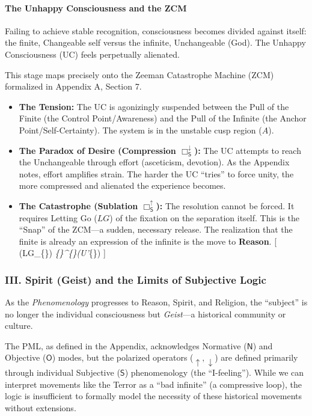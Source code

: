 \paragraph{The Unhappy Consciousness and the ZCM}\label{the-unhappy-consciousness-and-the-zcm}

Failing to achieve stable recognition, consciousness becomes divided against itself: the finite, Changeable self versus the infinite, Unchangeable (God). The Unhappy Consciousness (UC) feels perpetually alienated.

This stage maps precisely onto the Zeeman Catastrophe Machine (ZCM) formalized in Appendix A, Section 7.

\begin{itemize}
\tightlist
\item
  \textbf{The Tension:} The UC is agonizingly suspended between the Pull of the Finite (the Control Point/Awareness) and the Pull of the Infinite (the Anchor Point/Self-Certainty). The system is in the unstable cusp region (\(A\)).
\item
  \textbf{The Paradox of Desire (Compression \(\Box_{\mathsf{S}}^{\downarrow}\)):} The UC attempts to reach the Unchangeable through effort (asceticism, devotion). As the Appendix notes, effort amplifies strain. The harder the UC ``tries'' to force unity, the more compressed and alienated the experience becomes.
\item
  \textbf{The Catastrophe (Sublation \(\Box_{\mathsf{S}}^{\uparrow}\)):} The resolution cannot be forced. It requires Letting Go (\(LG\)) of the fixation on the separation itself. This is the ``Snap'' of the ZCM---a sudden, necessary release. The realization that the finite is already an expression of the infinite is the move to \textbf{Reason}. {[} (LG\_\{\}) \implies \Box\emph{\{\}\^{}\{\uparrow\}(U'}\{\}) {]}
\end{itemize}

\subsubsection{III. Spirit (Geist) and the Limits of Subjective Logic}\label{iii.-spirit-geist-and-the-limits-of-subjective-logic}

As the \emph{Phenomenology} progresses to Reason, Spirit, and Religion, the ``subject'' is no longer the individual consciousness but \emph{Geist}---a historical community or culture.

The PML, as defined in the Appendix, acknowledges Normative (\(\mathsf{N}\)) and Objective (\(\mathsf{O}\)) modes, but the polarized operators (\(\uparrow, \downarrow\)) are defined primarily through individual Subjective (\(\mathsf{S}\)) phenomenology (the ``I-feeling''). While we can interpret movements like the Terror as a ``bad infinite'' (a compressive loop), the logic is insufficient to formally model the necessity of these historical movements without extensions.

